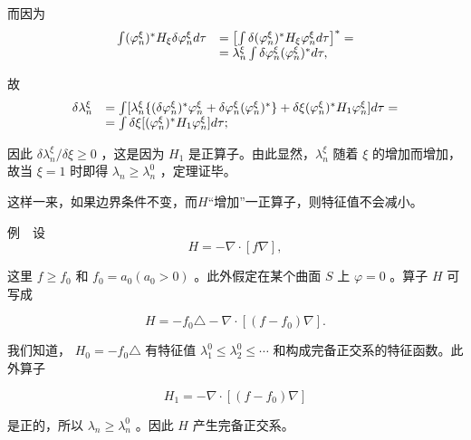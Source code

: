 而因为
\begin{equation*}
\begin{array}{r l} \int (\varphi_ {n} ^ {\xi}) ^ {*} H _ {\xi} \delta \varphi_ {n} ^ {\xi} d \tau & = \left[ \int \delta (\varphi_ {n} ^ {\xi}) ^ {*} H _ {\xi} \varphi_ {n} ^ {\xi} d \tau \right] ^ {*} = \\ & = \lambda_ {n} ^ {\xi} \int \delta \varphi_ {n} ^ {\xi} (\varphi_ {n} ^ {\xi}) ^ {*} d \tau , \end{array}
\end{equation*}

故
\begin{equation*}
\begin{array}{r l} \delta \lambda_ {n} ^ {\xi} & = \int [ \lambda_ {n} ^ {\xi} \{(\delta \varphi_ {n} ^ {\xi}) ^ {*} \varphi_ {n} ^ {\xi} + \delta \varphi_ {n} ^ {\xi} (\varphi_ {n} ^ {\xi}) ^ {*} \} + \delta \xi (\varphi_ {n} ^ {\xi}) ^ {*} H _ {1} \varphi_ {n} ^ {\xi} ] d \tau = \\ & = \int \delta \xi [ (\varphi_ {n} ^ {\xi}) ^ {*} H _ {1} \varphi_ {n} ^ {\xi} ] d \tau ; \end{array}
\end{equation*}

因此 $\delta \lambda_{n}^{\xi} / \delta \xi \geqslant 0$ ，这是因为 $H_{1}$ 是正算子。由此显然，$\lambda_{n}^{\xi}$ 随着 $\xi$ 的增加而增加，故当 $\xi = 1$ 时即得 $\lambda_{n} \geqslant \lambda_{n}^{0}$ ，定理证毕。

这样一来，如果边界条件不变，而$H$“增加”一正算子，则特征值不会减小。

例　设
\begin{equation*}
H = - \nabla \cdot [ f \nabla ],
\end{equation*}

这里 $f \geqslant f_0$ 和 $f_0 = a_0 (a_0 > 0)$ 。此外假定在某个曲面 $S$ 上 $\varphi = 0$ 。算子 $H$ 可写成

\begin{equation*}
H = - f _ {0} \triangle - \nabla \cdot [ (f - f _ {0}) \nabla ].
\end{equation*}

我们知道， $H_{0}=-f_{0}\triangle$ 有特征值 $\lambda_{1}^{0}\leqslant\lambda_{2}^{0}\leqslant\cdots$ 和构成完备正交系的特征函数。此外算子

\begin{equation*}
H _ {1} = - \nabla \cdot [ (f - f _ {0}) \nabla ]
\end{equation*}

是正的，所以 $\lambda_{n} \geqslant \lambda_{n}^{0}$ 。因此 $H$ 产生完备正交系。

